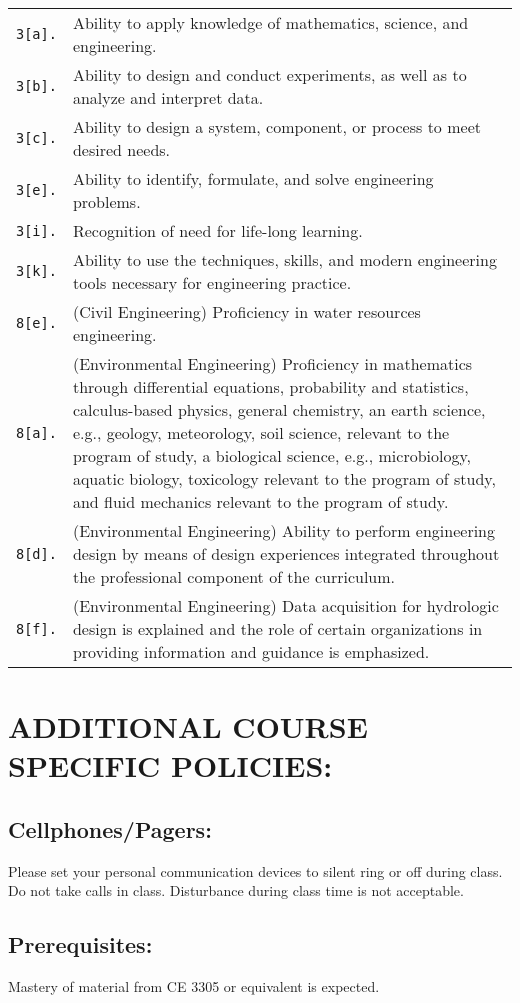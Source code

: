 \documentclass[12pt]{article}
\begin{document}
\begin{tabular}{p{0.5in}p{5.5in}}
\texttt{3[a].}  & Ability to apply knowledge of mathematics, science, and engineering.\\
\texttt{3[b].}  & Ability to design and conduct experiments, as well as to analyze and interpret data.\\
\texttt{3[c].}  & Ability to design a system, component, or process to meet desired needs.\\
\texttt{3[e].}  & Ability to identify, formulate, and solve engineering problems.\\
\texttt{3[i].}   & Recognition of need for life-long learning.\\
\texttt{3[k].}  & Ability to use the techniques, skills, and modern engineering tools necessary for engineering practice.\\
\texttt{8[e].}  & (Civil Engineering) Proficiency in water resources engineering. \\
\texttt{8[a].} & (Environmental Engineering) Proficiency in mathematics through differential
equations, probability and statistics, calculus-based physics, general chemistry, an earth
science, e.g., geology, meteorology, soil science, relevant to the program of study, a biological
science, e.g., microbiology, aquatic biology, toxicology relevant to the program of study, and
fluid mechanics relevant to the program of study. \\
\texttt{8[d].} & (Environmental Engineering) Ability to perform engineering design by means of
design experiences integrated throughout the professional component of the curriculum. \\
\texttt{8[f].} & (Environmental Engineering) Data acquisition for hydrologic design is explained and
the role of certain organizations in providing information and guidance is emphasized. \\
\end{tabular}
\section*{ADDITIONAL COURSE SPECIFIC POLICIES:}
\subsection*{Cellphones/Pagers: }
Please set your personal communication devices to silent ring or off during class. Do not take calls in class. Disturbance during class time is not acceptable.
\subsection*{Prerequisites:} 
Mastery of material from CE 3305 or equivalent is expected.
\end{document}
